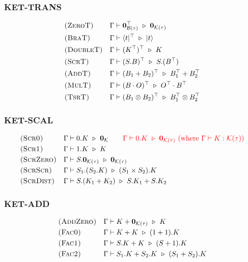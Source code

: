 \subsubsection*{\textsf{KET-TRANS}}
\begin{align*}
  & \textsc{(ZeroT)} && \Gamma \vdash \mathbf{0}_{\mathcal{B}(\tau)}^\top \ \triangleright\  \mathbf{0}_{\mathcal{K}(\tau)} \\
  & \textsc{(BraT)} && \Gamma \vdash \langle t|^\top \ \triangleright\  |t\rangle\\
  & \textsc{(DoubleT)} && \Gamma \vdash (K^\top)^\top \ \triangleright\  K \\
  & \textsc{(ScrT)} && \Gamma \vdash (S.B)^\top \ \triangleright\  S.(B^\top) \\
  & \textsc{(AddT)} && \Gamma \vdash (B_1 + B_2)^\top \ \triangleright\  B_1^\top + B_2^\top\\
  & \textsc{(MulT)} && \Gamma \vdash (B \cdot O)^\top \ \triangleright\  O^\top \cdot B^\top \\
  & \textsc{(TsrT)} && \Gamma \vdash (B_1 \otimes B_2)^\top \ \triangleright\  B_1^\top \otimes B_2^\top
\end{align*}

\subsubsection*{\textsf{KET-SCAL}}
\begin{align*}
  & \textsc{(Scr0)} && \Gamma \vdash 0.K \ \triangleright\  \textbf{0}_{\mathcal{K}}
  \qquad
  \textcolor{red}{\Gamma \vdash 0.K \ \triangleright\  \mathbf{0}_{\mathcal{K}(\tau)}\ \textrm{(where $\Gamma \vdash K : \mathcal{K}(\tau)$)}} \\
  & \textsc{(Scr1)} && \Gamma \vdash 1.K \ \triangleright\  K \\
  & \textsc{(ScrZero)} && \Gamma \vdash S.\mathbf{0}_{\mathcal{K}(\tau)} \ \triangleright\  \mathbf{0}_{\mathcal{K}(\tau)} \\
  & \textsc{(ScrScr)} && \Gamma \vdash S_1.(S_2.K) \ \triangleright\  (S_1 \times S_2).K \\
  & \textsc{(ScrDist)} && \Gamma \vdash S.(K_1 + K_2) \ \triangleright\  S.K_1 + S.K_2
\end{align*}

\subsubsection*{\textsf{KET-ADD}}
\begin{align*}
  & \textsc{(AddZero)} && \Gamma \vdash K + \mathbf{0}_{\mathcal{K}(\tau)} \ \triangleright\  K \\
  & \textsc{(Fac0)} && \Gamma \vdash K + K \ \triangleright\  (1 + 1).K \\
  & \textsc{(Fac1)} && \Gamma \vdash S.K + K \ \triangleright\  (S + 1).K \\
  & \textsc{(Fac2)} && \Gamma \vdash S_1.K + S_2.K \ \triangleright\  (S_1 + S_2).K
\end{align*}


